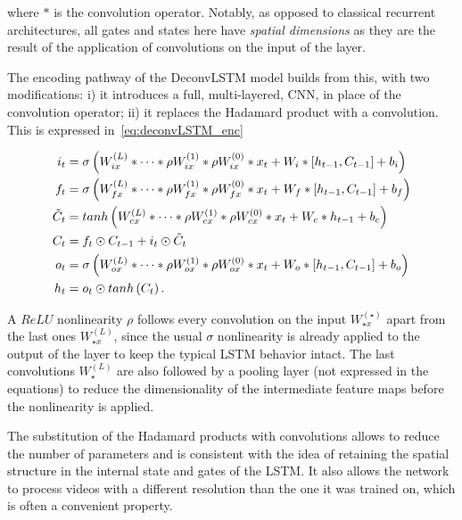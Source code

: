 \noindent where $*$ is the convolution operator. Notably, as opposed to
classical recurrent architectures, all gates and states here have \emph{spatial
dimensions} as they are the result of the application of convolutions on the
input of the layer.

The encoding pathway of the DeconvLSTM model builds from this, with two
modifications: i) it introduces a full, multi-layered, CNN, in place of the
convolution operator; ii) it replaces the Hadamard product with a convolution.
This is expressed in~\autoref{eq:deconvLSTM_enc}

\begin{equation}\label{eq:deconvLSTM_enc}
\begin{split}
    i_t &= \sigma\left(W_{ix}^{(L)} * \dots * \rho W_{ix}^{(1)} *
        \rho W_{ix}^{(0)} * x_t + W_i * \left[h_{t-1}, C_{t-1}\right] +
        b_i \right)\\
    f_t &= \sigma\left(W_{fx}^{(L)} * \dots * \rho W_{fx}^{(1)} *
        \rho W_{fx}^{(0)} * x_t + W_f * \left[h_{t-1}, C_{t-1}\right] +
        b_f \right)\\
    \tilde C_t &= tanh \left(W_{cx}^{(L)} * \dots * \rho W_{cx}^{(1)} *
        \rho W_{cx}^{(0)} * x_t + W_c * h_{t-1} + b_c \right)\\
    C_t &= f_t \odot C_{t-1} + i_t \odot \tilde C_t\\
    o_t &= \sigma\left(W_{ox}^{(L)} * \dots * \rho W_{ox}^{(1)} *
        \rho W_{ox}^{(0)} * x_t + W_o * \left[h_{t-1}, C_{t-1}\right] +
        b_o \right)\\
    h_t &= o_t \odot tanh \left(C_t\right).
\end{split}
\end{equation}

\noindent A $ReLU$ nonlinearity $\rho$ follows every convolution on the input
$W_{\star x}^{(\star)}$ apart from the last ones $W_{\star x}^{(L)}$, since the
usual $\sigma$ nonlinearity is already applied to the output of the layer to
keep the typical LSTM behavior intact. The last convolutions $W_\star^{(L)}$
are also followed by a pooling layer (not expressed in the equations) to reduce
the dimensionality of the intermediate feature maps before the nonlinearity is
applied.

The substitution of the Hadamard products with convolutions allows to reduce
the number of parameters and is consistent with the idea of retaining the
spatial structure in the internal state and gates of the LSTM. It also allows
the network to process videos with a different resolution than the one it was
trained on, which is often a convenient property.


